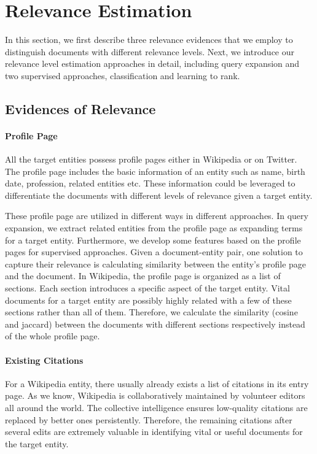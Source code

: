 \documentclass{sig-alternate}
\begin{document}
\section{Relevance Estimation}\label{sec:approaches}
In this section, we first describe three relevance evidences that we employ to distinguish documents with different relevance levels. Next, we introduce our relevance level estimation approaches in detail, including query expansion and two supervised approaches, classification and learning to rank.

\subsection{Evidences of Relevance}
\paragraph{Profile Page}
All the target entities possess profile pages either in Wikipedia or on Twitter. The profile page includes the basic information of an entity such as name, birth date, profession, related entities etc. These information could be leveraged to differentiate the documents with different levels of relevance given a target entity.

These profile page are utilized in different ways in different approaches.
In query expansion, we extract related entities from the profile page as expanding terms for a target entity. Furthermore, we develop some features based on the profile pages for supervised approaches. Given a document-entity pair, one solution to capture their relevance is calculating similarity between the entity's profile page and the document. In Wikipedia, the profile page is organized as a list of sections. Each section introduces a specific aspect of the target entity. Vital documents for a target entity are possibly highly related with a few of these sections rather than all of them. Therefore, we calculate the similarity (cosine and jaccard) between the documents with different sections respectively instead of the whole profile page.

\paragraph{Existing Citations}
For a Wikipedia entity, there usually already exists a list of citations in its entry page. As we know, Wikipedia is collaboratively maintained by volunteer editors all around the world. The collective intelligence ensures low-quality citations are replaced by better ones persistently. Therefore, the remaining citations after several edits are extremely valuable in identifying vital or useful documents for the target entity.
\end{document}
